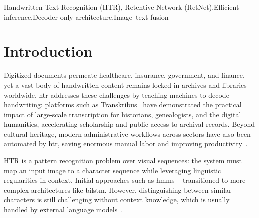 \documentclass[times, review, 10pt]{elsarticle}
\begin{document}
\begin{frontmatter}
\begin{keyword}
Handwritten Text Recognition (HTR)\sep 
Retentive Network (RetNet)\sep Efficient inference\sep Decoder-only architecture\sep Image–text fusion



\end{keyword}

\end{frontmatter}



\setlength{\textfloatsep}{10pt plus 2pt minus 2pt}
\setlength{\floatsep}{8pt plus 2pt minus 2pt}
\setlength{\intextsep}{10pt plus 2pt minus 2pt}
\setlength{\abovecaptionskip}{4pt}
\setlength{\belowcaptionskip}{0pt}

\setlength{\abovedisplayskip}{6pt plus 2pt minus 2pt}
\setlength{\belowdisplayskip}{6pt plus 2pt minus 2pt}
\setlength{\abovedisplayshortskip}{4pt plus 2pt minus 2pt}
\setlength{\belowdisplayshortskip}{4pt plus 2pt minus 2pt}


\section{Introduction}
\label{sec:intro}

Digitized documents permeate healthcare, insurance, government, and finance, yet a vast body of handwritten content remains locked in archives and libraries worldwide. \ac{htr} addresses these challenges by teaching machines to decode handwriting: platforms such as Transkribus~\cite{Nockels2022} have demonstrated the practical impact of large-scale transcription for historians, genealogists, and the digital humanities, accelerating scholarship and public access to archival records. Beyond cultural heritage, modern administrative workflows across sectors have also been automated by \ac{htr}, saving enormous manual labor and improving productivity~\cite{blueprism_handwriting_ocr}.

HTR is a pattern recognition problem over visual sequences: the system must map an input image to a character sequence while leveraging linguistic regularities in context. 
Initial approaches such as \acp{hmm} ~\cite{HMM_HTR} transitioned to more complex architectures like \ac{bilstm}. However, distinguishing between similar characters is still challenging without context knowledge, which is usually handled by external language models~\cite{statisticallanguage}.
\end{document}
